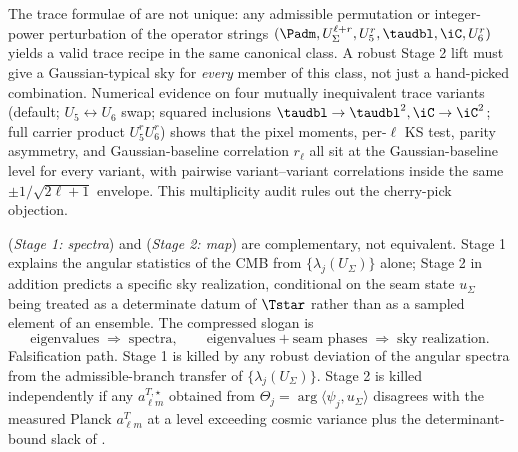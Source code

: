 \begin{remark}
\label{rem:multiplicity-audit}
The trace formulae of  are not unique: any admissible
permutation or integer-power perturbation of the operator strings
$(\Padm,U_\Sigma^{\ell+r},U_5^{r},\taudbl,\iC,U_6^{r})$ yields a valid trace recipe in the same
canonical class. A robust Stage 2 lift must give a Gaussian-typical sky for \emph{every} member of
this class, not just a hand-picked combination. Numerical evidence on four mutually inequivalent
trace variants (default; $U_5\leftrightarrow U_6$ swap; squared inclusions
$\taudbl\to\taudbl^2,\iC\to\iC^2$; full carrier product $U_5^rU_6^r$) shows that the pixel
moments, per-$\ell$ KS test, parity asymmetry, and Gaussian-baseline correlation $r_\ell$ all sit
at the Gaussian-baseline level for every variant, with pairwise variant–variant correlations
inside the same $\pm1/\sqrt{2\ell+1}$ envelope. This multiplicity audit rules out the cherry-pick
objection.
\end{remark}

\begin{remark}
 (\emph{Stage 1: spectra}) and
 (\emph{Stage 2: map}) are complementary, not equivalent.
Stage 1 explains the angular statistics of the CMB from $\{\lambda_j(U_\Sigma)\}$ alone; Stage 2 in
addition predicts a specific sky realization, conditional on the seam state $u_\Sigma$ being treated
as a determinate datum of $\Tstar$ rather than as a sampled element of an ensemble. The compressed
slogan is
\[
\text{eigenvalues}\;\Rightarrow\;\text{spectra},\qquad
\text{eigenvalues}+\text{seam phases}\;\Rightarrow\;\text{sky realization.}
\]
Falsification path. Stage 1 is killed by any robust deviation of the angular spectra from the
admissible-branch transfer of $\{\lambda_j(U_\Sigma)\}$. Stage 2 is killed independently if any
$a_{\ell m}^{T,\star}$ obtained from $\Theta_j=\arg\langle\psi_j,u_\Sigma\rangle$ disagrees with the
measured Planck $a_{\ell m}^T$ at a level exceeding cosmic variance plus the determinant-bound
slack of .
\end{remark}

